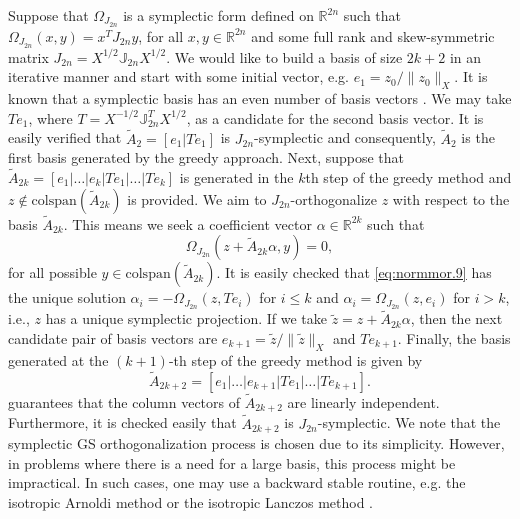 Suppose that $\Omega_{J_{2n}}$ is a symplectic form defined on $\mathbb R^{2n}$ such that $\Omega_{J_{2n}}(x,y) = x^T J_{2n} y$, for all $x,y\in \mathbb R^{2n}$ and some full rank and skew-symmetric matrix $J_{2n} = X^{1/2} \mathbb J_{2n} X^{1/2}$. We would like to build a basis of size $2k+2$ in an iterative manner and start with some initial vector, e.g. $e_1 = z_0/\| z_0 \|_X$. It is known that a symplectic basis has an even number of basis vectors \cite{Marsden:2010:IMS:1965128}. We may take $Te_1$, where $T = X^{-1/2} \mathbb J_{2n}^{T}X^{1/2}$, as a candidate for the second basis vector. It is easily verified that $\tilde A_2=[e_1|Te_1]$ is $J_{2n}$-symplectic and consequently, $\tilde A_2$ is the first basis generated by the greedy approach. Next, suppose that $\tilde A_{2k} = [e_1|\dots|e_k|Te_1|\dots|Te_k]$ is generated in the $k$th step of the greedy method and $z\not \in \text{colspan}\left(\tilde A_{2k}\right)$ is provided. We aim to $J_{2n}$-orthogonalize $z$ with respect to the basis $\tilde A_{2k}$. This means we seek a coefficient vector $\alpha\in \mathbb R^{2k}$ such that
\begin{equation} \label{eq:normmor.9}
	\Omega_{J_{2n}}\left( z + \tilde A_{2k}\alpha ,  y \right) = 0,
\end{equation}
for all possible $y \in \text{colspan}(\tilde A_{2k})$. It is easily checked that \eqref{eq:normmor.9} has the unique solution $\alpha_i = -\Omega_{J_{2n}}(z,Te_i)$ for $i\leq k$ and $\alpha_i = \Omega_{J_{2n}}(z,e_i)$ for $i>k$, i.e., $z$ has a unique symplectic projection. If we take $\tilde z = z + \tilde A_{2k}\alpha$, then the next candidate pair of basis vectors are $e_{k+1} = \tilde z / \| \tilde z \|_X$ and $Te_{k+1}$. Finally, the basis generated at the $(k+1)$-th step of the greedy method is given by
\begin{equation} \label{eq:normmor.11}
	\tilde A_{2k+2} = [e_1|\dots|e_{k+1}|Te_1|\dots|Te_{k+1}].
\end{equation}
 guarantees that the column vectors of $\tilde A_{2k+2}$ are linearly independent. Furthermore, it is checked easily that $\tilde A_{2k+2}$ is $J_{2n}$-symplectic. We note that the symplectic GS orthogonalization process is chosen due to its simplicity. However, in problems where there is a need for a large basis, this process might be impractical. In such cases, one may use a backward stable routine, e.g. the isotropic Arnoldi method or the isotropic Lanczos method \cite{doi:10.1137/S1064827500366434}.


